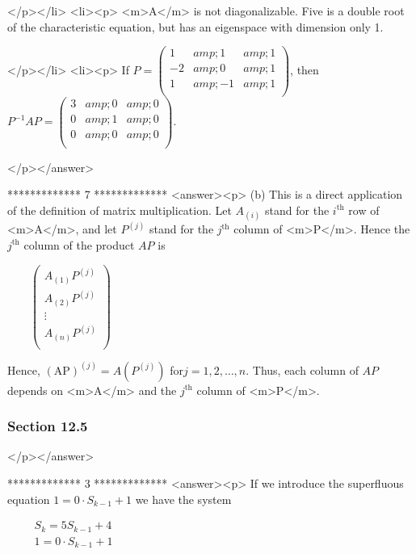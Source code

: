 </p></li>
<li><p> <m>A</m> is not diagonalizable. Five is a double root of the characteristic equation, but has an eigenspace with dimension only 1.

</p></li>
<li><p>  If  \(P=\left(
\begin{array}{ccc}
 1 &amp; 1 &amp; 1 \\
 -2 &amp; 0 &amp; 1 \\
 1 &amp; -1 &amp; 1 \\
\end{array}
\right)\), then \(P^{-1}A P=\left(
\begin{array}{ccc}
 3 &amp; 0 &amp; 0 \\
 0 &amp; 1 &amp; 0 \\
 0 &amp; 0 &amp; 0 \\
\end{array}
\right)\).

</p></answer>


*************
7
*************
<answer><p> (b) This is a direct application of the definition of matrix multiplication. Let \(A_{(i)}\) stand for the \(i^{\text{th}}\) row of <m>A</m>,
and let \(P^{(j)}\) stand for the \(j^{\text{th}}\) column of  <m>P</m>.  Hence the \(j^{\text{th}}\) column of the product \(A P\) is



   $\quad \quad $\(\left(
\begin{array}{c}
 A_{(1)}P^{(j)} \\
 A_{(2)}P^{(j)} \\
 \vdots  \\
 A_{(n)}P^{(j)} \\
\end{array}
\right)\)



Hence, \((\text{AP})^{(j)}= A\left(P^{(j)}\right)\)  for\(j =1,2,\ldots , n\). Thus, each column of \(A P\) depends on <m>A</m> and the \(j^{\text{th}}\)
column of <m>P</m>.


\subsubsection{Section 12.5}

</p></answer>


*************
3
*************
<answer><p> If we introduce the superfluous equation \(1 = 0\cdot S_{k-1} + 1\) we have the system 



$\quad \quad $\(\begin{array}{c}
 S_k =5 S_{k-1}+ 4 \\
 1= 0\cdot S_{k-1} + 1 \\
\end{array}\)



